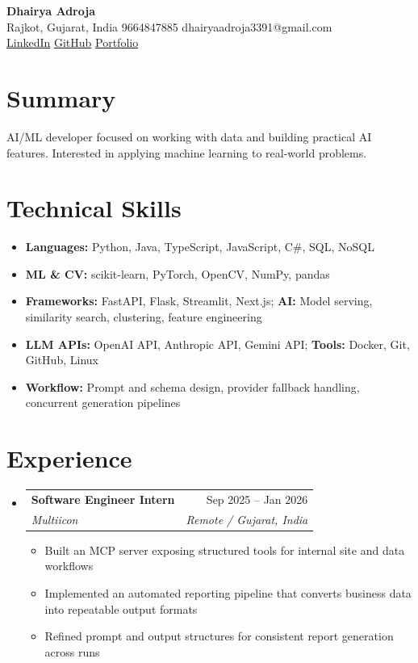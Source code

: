 \documentclass[11pt,a4paper]{article}
\makeatletter
\newcommand{\resumeSubheading}[4]{
  \vspace{-1pt}\item
    \begin{tabular*}{0.97\textwidth}[t]{l@{\extracolsep{\fill}}r}
      \textbf{#1} & #2 \\
      \textit{#3} & \textit{#4} \\
    \end{tabular*}\vspace{-3pt}
}
\newcommand{\resumeItem}[1]{
  \item\small{#1 \vspace{-1pt}}
}
\makeatother
\begin{document}
\begin{center}
    {\huge \textbf{Dhairya Adroja}} \\
    \vspace{8pt}
    \small Rajkot, Gujarat, India \textbar{} 9664847885 \textbar{} dhairyaadroja3391@gmail.com \\
    \small
    \href{https://www.linkedin.com/in/adrojadhairya}{LinkedIn} \textbar{}
    \href{https://www.github.com/Dhairya3391}{GitHub} \textbar{}
    \href{https://dhairya.codes}{Portfolio}
\end{center}

\section{Summary}
\noindent AI/ML developer focused on working with data and building practical AI features. Interested in applying machine learning to real-world problems.

\section{Technical Skills}
\begin{itemize}[leftmargin=*]
  \resumeItem{\textbf{Languages:} Python, Java, TypeScript, JavaScript, C\#, SQL, NoSQL}
  \resumeItem{\textbf{ML \& CV:} scikit-learn, PyTorch, OpenCV, NumPy, pandas}
  \resumeItem{\textbf{Frameworks:} FastAPI, Flask, Streamlit, Next.js; \textbf{AI:} Model serving, similarity search, clustering, feature engineering}
  \resumeItem{\textbf{LLM APIs:} OpenAI API, Anthropic API, Gemini API; \textbf{Tools:} Docker, Git, GitHub, Linux}
  \resumeItem{\textbf{Workflow:} Prompt and schema design, provider fallback handling, concurrent generation pipelines}
\end{itemize}

\section{Experience}
\begin{itemize}[leftmargin=*]
\resumeSubheading
{Software Engineer Intern}{Sep 2025 -- Jan 2026}
{Multiicon}{Remote / Gujarat, India}
\begin{itemize}[leftmargin=*]
  \resumeItem{Built an MCP server exposing structured tools for internal site and data workflows}
  \resumeItem{Implemented an automated reporting pipeline that converts business data into repeatable output formats}
  \resumeItem{Refined prompt and output structures for consistent report generation across runs}
\end{itemize}
\end{itemize}
\end{document}
